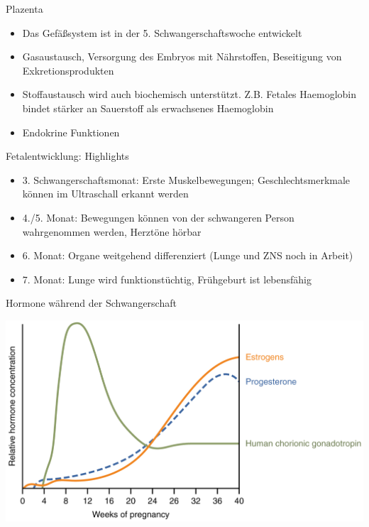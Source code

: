 \documentclass{beamer}
\begin{document}
\begin{frame}{Plazenta}

\begin{itemize}
    \item 
    Das Gefäßsystem ist in der 5. Schwangerschaftswoche entwickelt
    \item
    Gasaustausch, Versorgung des Embryos mit Nährstoffen, Beseitigung von Exkretionsprodukten
    \item
    Stoffaustausch wird auch biochemisch unterstützt. Z.B.
    Fetales Haemoglobin bindet stärker an Sauerstoff als erwachsenes Haemoglobin 
    \item
    Endokrine Funktionen

\end{itemize}




    
\end{frame}


\begin{frame}{Fetalentwicklung: Highlights}

\begin{itemize}
\item
3. Schwangerschaftsmonat: Erste Muskelbewegungen; Geschlechtsmerkmale können im Ultraschall erkannt werden 
\item
4./5. Monat: Bewegungen können von der schwangeren Person wahrgenommen werden,  Herztöne hörbar
\item
6. Monat: Organe weitgehend differenziert (Lunge und ZNS noch in Arbeit)
\item
7. Monat: Lunge wird funktionstüchtig, Frühgeburt ist lebensfähig
\end{itemize}
\end{frame}

\begin{frame}{Hormone während der Schwangerschaft }

\begin{center}
\includegraphics[width=\textwidth]{pregnancy_hormones.png} 
\end{center}
\end{frame}
  
\end{document}
